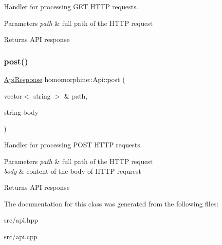 Handler for processing G\+ET H\+T\+TP requests.


\begin{DoxyParams}{Parameters}
{\em path} & full path of the H\+T\+TP request \\
\hline
\end{DoxyParams}
\begin{DoxyReturn}{Returns}
A\+PI response 
\end{DoxyReturn}
\mbox{\label{classhomomorphine_1_1_api_ab538a352f9ef7e92885bdd25a2f3dedd}} 
\subsubsection{\texorpdfstring{post()}{post()}}
{\footnotesize\ttfamily \hyperlink{classhomomorphine_1_1_api_response}{Api\+Response} homomorphine\+::\+Api\+::post (\begin{DoxyParamCaption}\item[{vector$<$ string $>$ \&}]{path,  }\item[{string}]{body }\end{DoxyParamCaption})}

Handler for processing P\+O\+ST H\+T\+TP requests.


\begin{DoxyParams}{Parameters}
{\em path} & full path of the H\+T\+TP request \\
\hline
{\em body} & content of the body of H\+T\+TP requrest \\
\hline
\end{DoxyParams}
\begin{DoxyReturn}{Returns}
A\+PI response 
\end{DoxyReturn}


The documentation for this class was generated from the following files\+:\begin{DoxyCompactItemize}
\item 
src/api.\+hpp\item 
src/api.\+cpp\end{DoxyCompactItemize}
